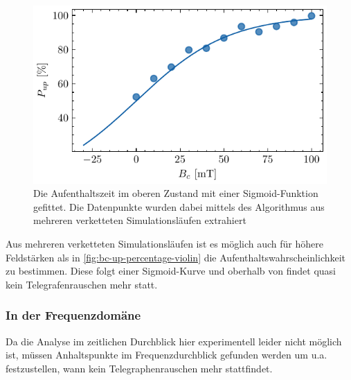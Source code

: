 \documentclass[main.tex]{subfiles}
\begin{document}
\begin{figure}[H]
    \centering
    \includegraphics{bilder/plots/max_Bz/up_percentage_fit.pdf}
    \caption{Die Aufenthaltszeit im oberen Zustand mit einer Sigmoid-Funktion gefittet. Die Datenpunkte wurden dabei mittels des Algorithmus aus mehreren verketteten Simulationsläufen extrahiert}\label{fig:bc-up-percentage}
\end{figure}

Aus mehreren verketteten Simulationsläufen ist es möglich auch für höhere Feldstärken als in \cref{fig:bc-up-percentage-violin} die Aufenthaltswahrscheinlichkeit zu bestimmen. Diese folgt einer Sigmoid-Kurve  und oberhalb von  findet quasi kein Telegrafenrauschen mehr statt.


\subsubsection{In der Frequenzdomäne}

Da die Analyse im zeitlichen Durchblick hier experimentell leider nicht möglich ist, müssen Anhaltspunkte im Frequenzdurchblick gefunden werden um u.a. festzustellen, wann kein Telegraphenrauschen mehr stattfindet.
\end{document}
